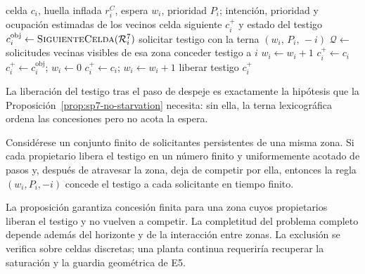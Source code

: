 \begin{algorithm}[!htbp]
\caption{Reserva vecinal y avance discreto de una coalición (E7)}
\label{alg:sp7-reserva}
\begin{algorithmic}[1]
\Require celda $c_i$, huella inflada $r_i^C$, espera $w_i$, prioridad $P_i$;
         intención, prioridad y ocupación estimadas de los vecinos
\Ensure celda siguiente $c_i^+$ y estado del testigo
\State $c_i^{\mathrm{obj}} \gets \Call{SiguienteCelda}{\mathcal R_i^7}$
  \State solicitar testigo con la terna $(w_i,\,P_i,\,-i)$
  \State $\mathcal Q \gets$ solicitudes vecinas visibles de esa zona
    \State conceder testigo a $i$
  \Else
    \State $w_i \gets w_i + 1$
    \State \Return $c_i^+ \gets c_i$
  \EndIf
\EndIf
{}
  \State $c_i^+ \gets c_i^{\mathrm{obj}}$; $w_i \gets 0$
\Else
  \State $c_i^+ \gets c_i$; $w_i \gets w_i + 1$
\EndIf
{}
  \State liberar testigo
\EndIf
\State \Return $c_i^+$
\end{algorithmic}
\end{algorithm}

La liberación del testigo tras el paso de despeje es exactamente la hipótesis que
la Proposición~\ref{prop:sp7-no-starvation} necesita: sin ella, la terna
lexicográfica ordena las concesiones pero no acota la espera.

\begin{proposicion}
\label{prop:sp7-no-starvation}
Considérese un conjunto finito de solicitantes persistentes de una misma zona.
Si cada propietario libera el testigo en un número finito y uniformemente acotado
de pasos y, después de atravesar la zona, deja de competir por ella, entonces
la regla $(w_i,P_i,-i)$ concede el testigo a cada solicitante en tiempo finito.
\end{proposicion}
La proposición garantiza concesión finita para una zona cuyos propietarios liberan el testigo y no vuelven a competir. La completitud del problema completo depende además del horizonte y de la interacción entre zonas. La exclusión se verifica sobre celdas discretas; una planta continua requeriría recuperar la saturación y la guardia geométrica de E5.

